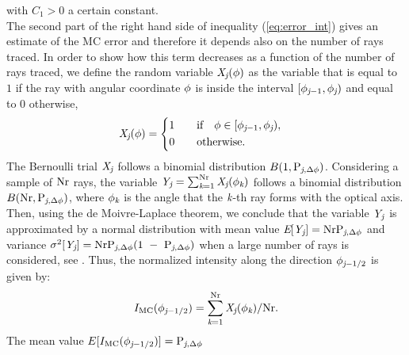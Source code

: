 with $C_1>0$ a certain constant. \\
\indent
The second part of the right hand side of inequality (\ref{eq:error_int}) gives an estimate of the MC error and therefore it depends also on the
number of rays traced.
In order to show how this term decreases as a function of the number of rays traced,
we define the random variable $\textit{X}_{\textit{j}}(\phi)$ as the variable that is equal to $1$ if the ray with angular coordinate $\phi$
is inside the interval $[\phi_{\textit{j}-1}, \phi_{\textit{j}})$ and equal to $0$ otherwise,
\begin{equation}
\label{radom_variable}
\textit{X}_{\textit{j}}(\phi) = \begin{cases} \begin{aligned}
1& \qquad \mbox{if} \quad \phi\in [\phi_{\textit{j}-1}, \phi_{\textit{j}}),\\
0 & \qquad \mbox{otherwise}.
\end{aligned}\end{cases}
\end{equation}
The Bernoulli trial $ \textit{X}_{\textit{j}}$ follows a binomial distribution $B(1,\textrm{P}_{\textit{j}, \Delta\phi})$.
Considering a sample of $\textrm{Nr}$ rays, the variable $\textit{Y}_{\textit{j}} = \sum_{\textit{k}=1}^{\textrm{Nr}} \textit{X}_{\textit{j}}(\phi_{\textit{k}})$
follows a binomial distribution $B(\textrm{Nr}, \textrm{P}_{\textit{j},\Delta \phi})$, where $\phi_{\textit{k}}$ is the angle that the $\textit{k}$-th ray forms
 with the optical axis. Then, using the de Moivre-Laplace theorem, we conclude that the variable $\textit{Y}_{\textit{j}}$ is approximated by a normal distribution with mean value 
$\textit{E}[\textit{Y}_{\textit{j}}] = \textrm{Nr}\textrm{P}_{\textit{j}, \Delta\phi}$ and variance $\sigma^2[\textit{Y}_{\textit{j}}] = \textrm{Nr}\textrm{P}_{\textit{j}, \Delta\phi}(1~-~\textrm{P}_{\textit{j}, \Delta\phi})$ 
when a large number of rays is considered, see \cite{Rubinstein, deMoivre}.
Thus, the normalized intensity along the direction $\phi_{\textit{j}-1/2}$ is given by:
\begin{equation}I_{\textrm{MC}}(\phi_{\textit{j}-1/2}) = \sum_{\textit{k}=1}^{\textrm{Nr}}\textit{X}_{\textit{j}}(\phi_{\textit{k}})/\textrm{Nr}.\end{equation}
The mean value $E[I_{\textrm{MC}}(\phi_{\textit{j}-1/2})]=\textrm{P}_{\textit{j}, \Delta\phi}$
